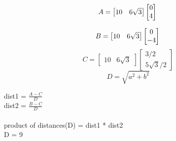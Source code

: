 \documentclass{article}
\begin{document}
 $$A = 
\begin{bmatrix}
 10 & 6\sqrt3
 \end{bmatrix}
\begin{bmatrix}
0\\
4
\end{bmatrix}\\$$

$$B =
\begin{bmatrix}
10 & 6\sqrt3
\end{bmatrix}
\begin{bmatrix}
0\\
-4
\end{bmatrix}\\$$
$$C = 
\begin{bmatrix}
10 & 6\sqrt3
\end{bmatrix}
\begin{bmatrix}
3/2 \\
5\sqrt3/2
\end{bmatrix}$$
$$D = 
  \sqrt{a^2 + b^2}$$
  
dist1 = 
$\frac{A-C}{D}\ $\\

dist2 = 
$\frac{B-C}{D}\ $\\
\\
product of distances(D) = dist1 * dist2\\

D = 9
\end{document}

